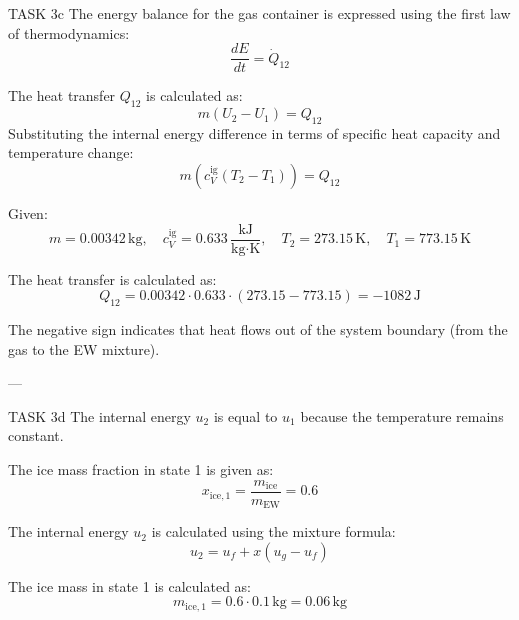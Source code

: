 TASK 3c  
The energy balance for the gas container is expressed using the first law of thermodynamics:  
\[
\frac{dE}{dt} = \dot{Q}_{12}
\]  

The heat transfer \( Q_{12} \) is calculated as:  
\[
m (U_2 - U_1) = Q_{12}
\]  
Substituting the internal energy difference in terms of specific heat capacity and temperature change:  
\[
m \left( c_V^{\text{ig}} (T_2 - T_1) \right) = Q_{12}
\]  

Given:  
\[
m = 0.00342 \, \text{kg}, \quad c_V^{\text{ig}} = 0.633 \, \frac{\text{kJ}}{\text{kg·K}}, \quad T_2 = 273.15 \, \text{K}, \quad T_1 = 773.15 \, \text{K}
\]  

The heat transfer is calculated as:  
\[
Q_{12} = 0.00342 \cdot 0.633 \cdot (273.15 - 773.15) = -1082 \, \text{J}
\]  

The negative sign indicates that heat flows out of the system boundary (from the gas to the EW mixture).  

---

TASK 3d  
The internal energy \( u_2 \) is equal to \( u_1 \) because the temperature remains constant.  

The ice mass fraction in state 1 is given as:  
\[
x_{\text{ice},1} = \frac{m_{\text{ice}}}{m_{\text{EW}}} = 0.6
\]  

The internal energy \( u_2 \) is calculated using the mixture formula:  
\[
u_2 = u_f + x (u_g - u_f)
\]  

The ice mass in state 1 is calculated as:  
\[
m_{\text{ice},1} = 0.6 \cdot 0.1 \, \text{kg} = 0.06 \, \text{kg}
\]  